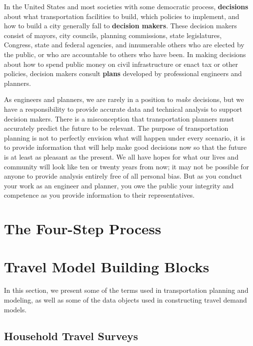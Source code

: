 \documentclass[
]{book}
\begin{document}
In the United States and most societies with some democratic process,
\textbf{decisions} about what transportation facilities to build, which policies to
implement, and how to build a city generally fall to \textbf{decision makers}. These
decision makers consist of mayors, city councils, planning commissions,
state legislatures, Congress, state and federal agencies, and innumerable others
who are elected by the public, or who are accountable to others who have been.
In making decisions about how to spend public money on civil infrastructure or
enact tax or other policies, decision makers consult \textbf{plans} developed by
professional engineers and planners.

As engineers and planners, we are rarely in a position to \emph{make} decisions, but
we have a responsibility to provide accurate data and technical analysis to
support decision makers. There is a misconception that transportation planners
must accurately predict the future to be relevant. The purpose of transportation
planning is not to perfectly envision what will happen under every scenario,
it is to provide information that will help make good decisions now so that
the future is at least as pleasant as the present. We all have hopes for what
our lives and community will look like ten or twenty years from now; it may not
be possible for anyone to provide analysis entirely free of all personal bias.
But as you conduct your work as an engineer and planner, you owe the public your
integrity and competence as you provide information to their representatives.

\hypertarget{the-four-step-process}{%
\section{The Four-Step Process}\label{the-four-step-process}}

\hypertarget{travel-model-building-blocks}{%
\section{Travel Model Building Blocks}\label{travel-model-building-blocks}}

In this section, we present some of the terms used in transportation planning
and modeling, as well as some of the data objects used in constructing travel
demand models.

\hypertarget{household-travel-surveys}{%
\subsection{Household Travel Surveys}\label{household-travel-surveys}}
\end{document}
